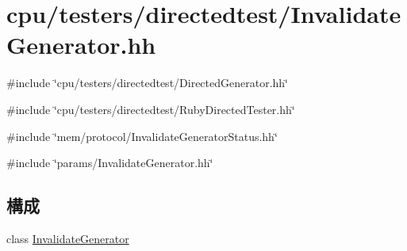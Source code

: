 \hypertarget{InvalidateGenerator_8hh}{
\section{cpu/testers/directedtest/InvalidateGenerator.hh}
\label{InvalidateGenerator_8hh}
}
{\ttfamily \#include \char`\"{}cpu/testers/directedtest/DirectedGenerator.hh\char`\"{}}\par
{\ttfamily \#include \char`\"{}cpu/testers/directedtest/RubyDirectedTester.hh\char`\"{}}\par
{\ttfamily \#include \char`\"{}mem/protocol/InvalidateGeneratorStatus.hh\char`\"{}}\par
{\ttfamily \#include \char`\"{}params/InvalidateGenerator.hh\char`\"{}}\par
\subsection*{構成}
\begin{DoxyCompactItemize}
\item 
class \hyperlink{classInvalidateGenerator}{InvalidateGenerator}
\end{DoxyCompactItemize}
